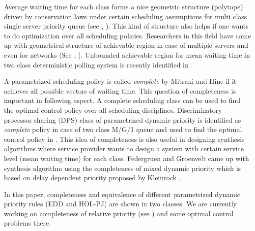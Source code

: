 \documentclass[a4paper,12pt]{article}
\begin{document}
Average waiting time for each class forms a nice geometric structure (polytope) driven by conservation laws under certain scheduling assumptions for multi class single server priority queue (see \cite{coffman1980characterization}, \cite{shanthikumar1992multiclass}). This kind of structure also helps if one wants to do optimization over all scheduling policies. Researchers in this field have come up with geometrical structure of achievable region in case of multiple servers and even for networks (See \cite{federgruen}, \cite{bertsimas}). Unbounded achievable region for mean waiting time in two class deterministic polling system is recently identified in \cite{2classpolling}. 


A parametrized scheduling policy is called \textit{complete} by Mitrani and Hine \cite{complete} if it achieves all possible vectors of waiting time. This question of completeness is important in following aspect. A complete scheduling class can be used to find the optimal control policy over all scheduling disciplines. Discriminatory processor sharing (DPS) class of parametrized dynamic priority is identified as \textit{complete} policy in case of two class M/G/1 queue and used to find the optimal control policy in \cite{hassin2009use}. This idea of completeness is also useful in designing synthesis algorithms where service provider wants to design a system with certain service level (mean waiting time) for each class. Federgruen and Groenvelt \cite{federgruen} came up with synthesis algorithm using the completeness of mixed dynamic priority which is based on delay dependent priority proposed by Kleinrock \cite{Kleinrock1964}. 

In this paper, completeness and equivalence of different parametrized dynamic priority rules (EDD and HOL-PJ) are shown in two classes. We are currently working on completeness of relative priority (see \cite{haviv2}) and some optimal control problems there. 
\end{document}
